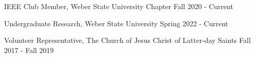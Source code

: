  






IEEE Club Member, Weber State University Chapter     \hfill Fall 2020 - Current

Undergraduate Research, Weber State University      \hfill Spring 2022 - Current

Volunteer Representative, The Church of Jesus Christ of Latter-day Saints       \hfill Fall 2017 - Fall 2019



